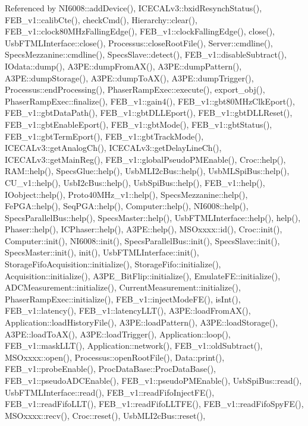 Referenced by N\+I6008\+::add\+Device(), I\+C\+E\+C\+A\+Lv3\+::bxid\+Resynch\+Status(), F\+E\+B\+\_\+v1\+::calib\+Cte(), check\+Cmd(), Hierarchy\+::clear(), F\+E\+B\+\_\+v1\+::clock80\+M\+Hz\+Falling\+Edge(), F\+E\+B\+\_\+v1\+::clock\+Falling\+Edge(), close(), Usb\+F\+T\+M\+L\+Interface\+::close(), Processus\+::close\+Root\+File(), Server\+::cmdline(), Specs\+Mezzanine\+::cmdline(), Specs\+Slave\+::detect(), F\+E\+B\+\_\+v1\+::disable\+Subtract(), I\+Odata\+::dump(), A3\+P\+E\+::dump\+From\+A\+X(), A3\+P\+E\+::dump\+Pattern(), A3\+P\+E\+::dump\+Storage(), A3\+P\+E\+::dump\+To\+A\+X(), A3\+P\+E\+::dump\+Trigger(), Processus\+::end\+Processing(), Phaser\+Ramp\+Exec\+::execute(), export\+\_\+obj(), Phaser\+Ramp\+Exec\+::finalize(), F\+E\+B\+\_\+v1\+::gain4(), F\+E\+B\+\_\+v1\+::gbt80\+M\+Hz\+Clk\+Eport(), F\+E\+B\+\_\+v1\+::gbt\+Data\+Path(), F\+E\+B\+\_\+v1\+::gbt\+D\+L\+L\+Eport(), F\+E\+B\+\_\+v1\+::gbt\+D\+L\+L\+Reset(), F\+E\+B\+\_\+v1\+::gbt\+Enable\+Eport(), F\+E\+B\+\_\+v1\+::gbt\+Mode(), F\+E\+B\+\_\+v1\+::gbt\+Status(), F\+E\+B\+\_\+v1\+::gbt\+Term\+Eport(), F\+E\+B\+\_\+v1\+::gbt\+Track\+Mode(), I\+C\+E\+C\+A\+Lv3\+::get\+Analog\+Ch(), I\+C\+E\+C\+A\+Lv3\+::get\+Delay\+Line\+Ch(), I\+C\+E\+C\+A\+Lv3\+::get\+Main\+Reg(), F\+E\+B\+\_\+v1\+::global\+Pseudo\+P\+M\+Enable(), Croc\+::help(), R\+A\+M\+::help(), Specs\+Glue\+::help(), Usb\+M\+L\+I2c\+Bus\+::help(), Usb\+M\+L\+Spi\+Bus\+::help(), C\+U\+\_\+v1\+::help(), Usb\+I2c\+Bus\+::help(), Usb\+Spi\+Bus\+::help(), F\+E\+B\+\_\+v1\+::help(), I\+Oobject\+::help(), Proto40\+M\+Hz\+\_\+v1\+::help(), Specs\+Mezzanine\+::help(), Fe\+P\+G\+A\+::help(), Seq\+P\+G\+A\+::help(), Computer\+::help(), N\+I6008\+::help(), Specs\+Parallel\+Bus\+::help(), Specs\+Master\+::help(), Usb\+F\+T\+M\+L\+Interface\+::help(), help(), Phaser\+::help(), I\+C\+Phaser\+::help(), A3\+P\+E\+::help(), M\+S\+Oxxxx\+::id(), Croc\+::init(), Computer\+::init(), N\+I6008\+::init(), Specs\+Parallel\+Bus\+::init(), Specs\+Slave\+::init(), Specs\+Master\+::init(), init(), Usb\+F\+T\+M\+L\+Interface\+::init(), Storage\+Fifo\+Acquisition\+::initialize(), Storage\+Fifo\+::initialize(), Acquisition\+::initialize(), A3\+P\+E\+\_\+\+Bit\+Flip\+::initialize(), Emulate\+F\+E\+::initialize(), A\+D\+C\+Measurement\+::initialize(), Current\+Measurement\+::initialize(), Phaser\+Ramp\+Exec\+::initialize(), F\+E\+B\+\_\+v1\+::inject\+Mode\+F\+E(), is\+Int(), F\+E\+B\+\_\+v1\+::latency(), F\+E\+B\+\_\+v1\+::latency\+L\+L\+T(), A3\+P\+E\+::load\+From\+A\+X(), Application\+::load\+History\+File(), A3\+P\+E\+::load\+Pattern(), A3\+P\+E\+::load\+Storage(), A3\+P\+E\+::load\+To\+A\+X(), A3\+P\+E\+::load\+Trigger(), Application\+::loop(), F\+E\+B\+\_\+v1\+::mask\+L\+L\+T(), Application\+::network(), F\+E\+B\+\_\+v1\+::old\+Subtract(), M\+S\+Oxxxx\+::open(), Processus\+::open\+Root\+File(), Data\+::print(), F\+E\+B\+\_\+v1\+::probe\+Enable(), Proc\+Data\+Base\+::\+Proc\+Data\+Base(), F\+E\+B\+\_\+v1\+::pseudo\+A\+D\+C\+Enable(), F\+E\+B\+\_\+v1\+::pseudo\+P\+M\+Enable(), Usb\+Spi\+Bus\+::read(), Usb\+F\+T\+M\+L\+Interface\+::read(), F\+E\+B\+\_\+v1\+::read\+Fifo\+Inject\+F\+E(), F\+E\+B\+\_\+v1\+::read\+Fifo\+L\+L\+T(), F\+E\+B\+\_\+v1\+::read\+Fifo\+L\+L\+T\+F\+E(), F\+E\+B\+\_\+v1\+::read\+Fifo\+Spy\+F\+E(), M\+S\+Oxxxx\+::recv(), Croc\+::reset(), Usb\+M\+L\+I2c\+Bus\+::reset(), 